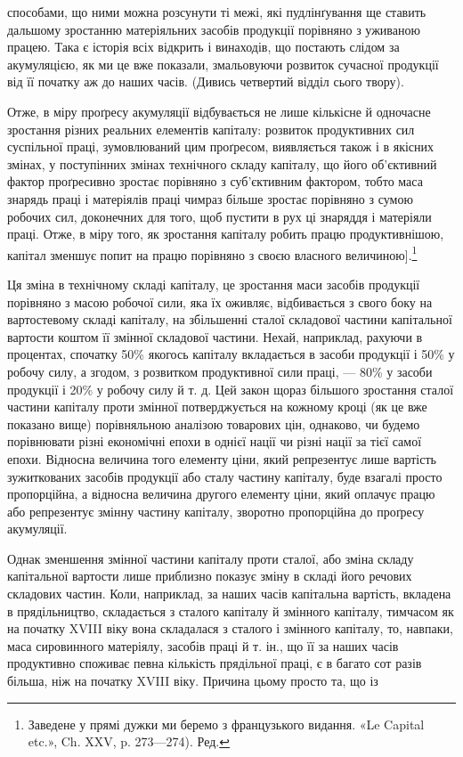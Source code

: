 способами, що ними можна розсунути ті межі, які пудлінґування
ще ставить дальшому зростанню матеріяльних засобів продукції
порівняно з уживаною працею. Така є історія всіх відкрить
і винаходів, що постають слідом за акумуляцією, як ми це
вже показали, змальовуючи розвиток сучасної продукції від її
початку аж до наших часів. (Дивись четвертий відділ сього
твору).

Отже, в міру проґресу акумуляції відбувається не лише
кількісне й одночасне зростання різних реальних елементів
капіталу: розвиток продуктивних сил суспільної праці, зумовлюваний
цим проґресом, виявляється також і в якісних змінах,
у поступінних змінах технічного складу капіталу, що його об’єктивний
фактор проґресивно зростає порівняно з суб’єктивним
фактором, тобто маса знарядь праці і матеріялів праці чимраз
більше зростає порівняно з сумою робочих сил, доконечних для
того, щоб пустити в рух ці знаряддя і матеріяли праці. Отже,
в міру того, як зростання капіталу робить працю продуктивнішою,
капітал зменшує попит на працю порівняно з своєю власного
величиною].\footnote*{
Заведене у прямі дужки ми беремо з французького видання.
«Le Capital etc.», Ch. XXV, p. 273—274). Ред.
}

Ця зміна в технічному складі капіталу, це зростання маси
засобів продукції порівняно з масою робочої сили, яка їх оживляє,
відбивається з свого боку на вартостевому складі капіталу, на
збільшенні сталої складової частини капітальної вартости коштом
її змінної складової частини. Нехай, наприклад, рахуючи
в процентах, спочатку 50\% якогось капіталу вкладається в засоби
продукції і 50\% у робочу силу, а згодом, з розвитком продуктивної
сили праці, — 80\% у засоби продукції і 20\% у робочу силу
й т. д. Цей закон щораз більшого зростання сталої частини капіталу
проти змінної потверджується на кожному кроці (як це вже
показано вище) порівняльною аналізою товарових цін, однаково,
чи будемо порівнювати різні економічні епохи в однієї нації
чи різні нації за тієї самої епохи. Відносна величина того елементу
ціни, який репрезентує лише вартість зужиткованих засобів
продукції або сталу частину капіталу, буде взагалі просто
пропорційна, а відносна величина другого елементу ціни, який
оплачує працю або репрезентує змінну частину капіталу, зворотно
пропорційна до проґресу акумуляції.

Однак зменшення змінної частини капіталу проти сталої,
або зміна складу капітальної вартости лише приблизно показує
зміну в складі його речових складових частин. Коли, наприклад,
за наших часів капітальна вартість, вкладена в прядільництво,
складається з  сталого капіталу й  змінного капіталу, тимчасом
як на початку XVIII віку вона складалася з  сталого
і  змінного капіталу, то, навпаки, маса сировинного матеріялу,
засобів праці й т. ін., що її за наших часів продуктивно споживає
певна кількість прядільної праці, є в багато сот разів більша,
ніж на початку XVIII віку. Причина цьому просто та, що із